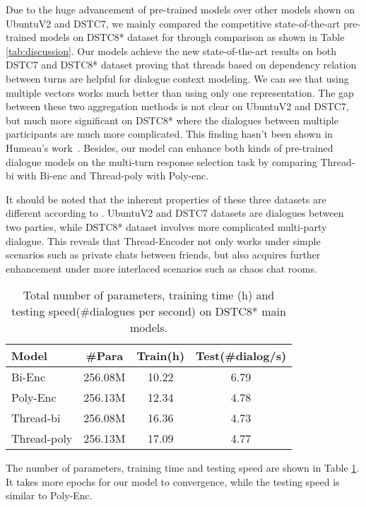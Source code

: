 Due to the huge advancement of pre-trained models over other models shown on UbuntuV2 and DSTC7, we mainly compared the competitive state-of-the-art pre-trained models on DSTC8* dataset for through comparison as shown in Table \ref{tab:discussion}.
Our models achieve the new state-of-the-art results on both DSTC7 and DSTC8* dataset proving that threads based on dependency relation between turns are helpful for dialogue context modeling. 
We can see that using multiple vectors works much better than using only one representation. The gap between these two aggregation methods is not clear on UbuntuV2 and DSTC7, but much more significant on DSTC8* where the dialogues between multiple participants are much more complicated. This finding hasn't been shown in Humeau's work~. Besides, our model can enhance both kinds of pre-trained dialogue models on the multi-turn response selection task by comparing Thread-bi with Bi-enc and Thread-poly with Poly-enc.

It should be noted that the inherent properties of these three datasets are different according to . UbuntuV2 and DSTC7 datasets are dialogues between two parties, while DSTC8* dataset involves more complicated multi-party dialogue. This reveals that Thread-Encoder not only works under simple scenarios such as private chats between friends, but also acquires further enhancement under more interlaced scenarios such as chaos chat rooms. 


\begin{table}[th!]
	\centering
	\small
	\begin{tabular}{lccc}
		\toprule[1pt]
		Model & \#Para & Train(h) & Test(\#dialog/s)   \\
		\midrule[1pt]
		Bi-Enc & 256.08M& 10.22 & 6.79  \\		
		Poly-Enc & 256.13M & 12.34 & 4.78 \\
		\hline
		Thread-bi &  256.08M& 16.36 &  4.73  \\
		Thread-poly &256.13M & 17.09 & 4.77  \\
		\bottomrule[1pt]
	\end{tabular}
	\caption{Total number of parameters, training time (h) and testing speed(\#dialogues per second) on DSTC8* main models.}
	\label{tab:dstc8}
\end{table}

The number of parameters, training time and testing speed are shown in Table \ref{tab:dstc8}. It takes more epochs for our model to convergence, while the testing speed is similar to Poly-Enc.




